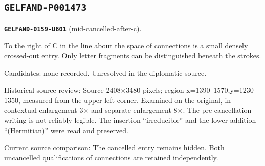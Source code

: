 \subsection*{\texttt{GELFAND-P001473}}
\par\noindent\leavevmode{}\label{GELFAND-0159-U601}\label{GELFAND-P001473:mid-cancelled-after-c}\textbf{\texttt{GELFAND-0159-U601}} (mid-cancelled-after-c).\nopagebreak[4]\par
To the right of C in the line about the space of connections is a small densely crossed-out entry. Only letter fragments can be distinguished beneath the strokes.\par
Candidates: none recorded. Unresolved in the diplomatic source.\par
Historical source review: Source 2408×3480 pixels; region x=1390–1570,y=1230–1350, measured from the upper-left corner. Examined on the original, in contextual enlargement 3× and separate enlargement 8×. The pre-cancellation writing is not reliably legible. The insertion “irreducible” and the lower addition “(Hermitian)” were read and preserved.\par
Current source comparison: The cancelled entry remains hidden. Both uncancelled qualifications of connections are retained independently.\par\medskip

